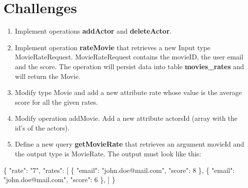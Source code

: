 \documentclass[]{book}
\newenvironment{Shaded}{\begin{snugshade}}{\end{snugshade}}
\newcommand{\KeywordTok}[1]{\textcolor[rgb]{0.13,0.29,0.53}{\textbf{#1}}}
\newcommand{\DataTypeTok}[1]{\textcolor[rgb]{0.13,0.29,0.53}{#1}}
\newcommand{\DecValTok}[1]{\textcolor[rgb]{0.00,0.00,0.81}{#1}}
\newcommand{\SpecialCharTok}[1]{\textcolor[rgb]{0.00,0.00,0.00}{#1}}
\newcommand{\StringTok}[1]{\textcolor[rgb]{0.31,0.60,0.02}{#1}}
\newcommand{\VerbatimStringTok}[1]{\textcolor[rgb]{0.31,0.60,0.02}{#1}}
\newcommand{\ImportTok}[1]{#1}
\newcommand{\OtherTok}[1]{\textcolor[rgb]{0.56,0.35,0.01}{#1}}
\newcommand{\FunctionTok}[1]{\textcolor[rgb]{0.00,0.00,0.00}{#1}}
\newcommand{\VariableTok}[1]{\textcolor[rgb]{0.00,0.00,0.00}{#1}}
\newcommand{\ControlFlowTok}[1]{\textcolor[rgb]{0.13,0.29,0.53}{\textbf{#1}}}
\newcommand{\OperatorTok}[1]{\textcolor[rgb]{0.81,0.36,0.00}{\textbf{#1}}}
\newcommand{\AttributeTok}[1]{\textcolor[rgb]{0.77,0.63,0.00}{#1}}
\newcommand{\NormalTok}[1]{#1}
\providecommand{\tightlist}{%
  \setlength{\itemsep}{0pt}\setlength{\parskip}{0pt}}
\begin{document}
\begin{Shaded}
\end{Shaded}

\section{Challenges}\label{challenges-2}

\begin{enumerate}
\def\labelenumi{\arabic{enumi}.}
\tightlist
\item
  Implement operations \textbf{addActor} and \textbf{deleteActor}.
\item
  Implement operation \textbf{rateMovie} that retrieves a new Input type
  MovieRateRequest. MovieRateRequest contains the movieID, the user
  email and the score. The operation will persist data into table
  \textbf{movies\_rates} and will return the Movie.
\item
  Modify type Movie and add a new attribute rate whose value is the
  average score for all the given rates.
\item
  Modify operation addMovie. Add a new attribute actorsId (array with
  the id's of the actors).
\item
  Define a new query \textbf{getMovieRate} that retrieves an argument
  movieId and the output type is MovieRate. The output must look like
  this:
\end{enumerate}

\begin{Shaded}
\begin{Highlighting}[]
\FunctionTok{\{}
  \DataTypeTok{"rate"}\FunctionTok{:} \StringTok{"7"}\FunctionTok{,}
  \DataTypeTok{"rates"}\FunctionTok{:} \OtherTok{[}
    \FunctionTok{\{}
      \DataTypeTok{"email"}\FunctionTok{:} \StringTok{"john.doe@mail.com"}\FunctionTok{,}
      \DataTypeTok{"score"}\FunctionTok{:} \DecValTok{8}
    \FunctionTok{\}}\OtherTok{,}
    \FunctionTok{\{}
      \DataTypeTok{"email"}\FunctionTok{:} \StringTok{"john.doe@mail.com"}\FunctionTok{,}
      \DataTypeTok{"score"}\FunctionTok{:} \DecValTok{6}
    \FunctionTok{\}}\OtherTok{,}
  \OtherTok{]}
\FunctionTok{\}}
\end{Highlighting}
\end{Shaded}
\end{document}
